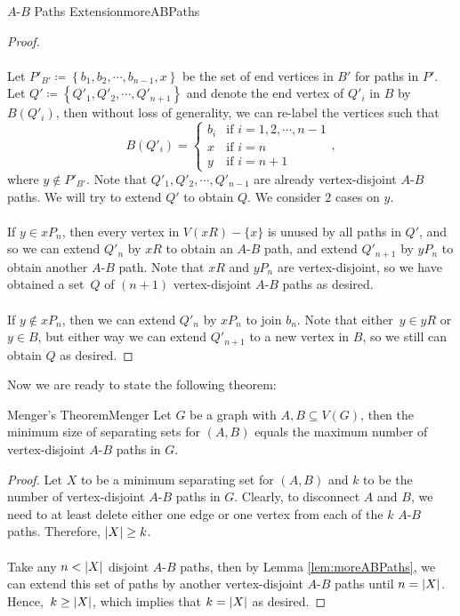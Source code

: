 \documentclass[math]{amznotes}
\theoremstyle{remark}
\newcommand{\0}{\mathbf{0}}
\newcommand{\1}{\mathbf{1}}
\begin{document}
\begin{lembox}{$A$-$B$ Paths Extension}{moreABPaths}
\begin{proof}
        \\\\
        Let $P'_{B'} \coloneqq \left\{b_1, b_2, \cdots, b_{n - 1}, x\right\}$ be the set of end vertices in $B'$ for paths in $P'$. Let $Q' \coloneqq \left\{Q'_1, Q'_2, \cdots, Q'_{n + 1}\right\}$ and denote the end vertex of $Q'_i$ in $B$ by $B(Q'_i)$, then without loss of generality, we can re-label the vertices such that 
        \begin{equation*}
            B(Q'_i) = \begin{cases}
                b_i & \textrm{if } i = 1, 2, \cdots, n - 1 \\
                x & \textrm{if } i = n \\
                y & \textrm{if } i = n + 1
            \end{cases},
        \end{equation*}
        where $y \notin P'_{B'}$. Note that $Q'_1, Q'_2, \cdots, Q'_{n - 1}$ are already vertex-disjoint $A$-$B$ paths. We will try to extend $Q'$ to obtain $Q$. We consider $2$ cases on $y$.
        \\\\
        If $y \in xP_n$, then every vertex in $V(xR) - \{x\}$ is unused by all paths in $Q'$, and so we can extend $Q'_n$ by $xR$ to obtain an $A$-$B$ path, and extend $Q'_{n + 1}$ by $yP_n$ to obtain another $A$-$B$ path. Note that $xR$ and $yP_n$ are vertex-disjoint, so we have obtained a set~$Q$ of $(n + 1)$ vertex-disjoint $A$-$B$ paths as desired.
        \\\\
        If $y \notin xP_n$, then we can extend $Q'_n$ by $xP_n$ to join $b_n$. Note that either~$y \in yR$ or $y \in B$, but either way we can extend $Q'_{n + 1}$ to a new vertex in $B$, so we still can obtain $Q$ as desired.
    \end{proof}
\end{lembox}
Now we are ready to state the following theorem:
\begin{thmbox}{Menger's Theorem}{Menger}
    Let $G$ be a graph with $A, B \subseteq V(G)$, then the minimum size of separating sets for $(A, B)$ equals the maximum number of vertex-disjoint $A$-$B$ paths in $G$.
    \tcblower
    \begin{proof}
        Let $X$ to be a minimum separating set for $(A, B)$ and $k$ to be the number of vertex-disjoint $A$-$B$ paths in $G$. Clearly, to disconnect $A$ and $B$, we need to at least delete either one edge or one vertex from each of the $k$ $A$-$B$ paths. Therefore, ${\left\lvert {X} \right\rvert} \geq k$.
        \\\\
        Take any $n < {\left\lvert {X} \right\rvert}$ disjoint $A$-$B$ paths, then by Lemma \ref{lem:moreABPaths}, we can extend this set of paths by another vertex-disjoint $A$-$B$ paths until $n = {\left\lvert {X} \right\rvert}$. Hence,~$k \geq {\left\lvert {X} \right\rvert}$, which implies that $k = {\left\lvert {X} \right\rvert}$ as desired.
    \end{proof}
\end{thmbox}
\end{document}
